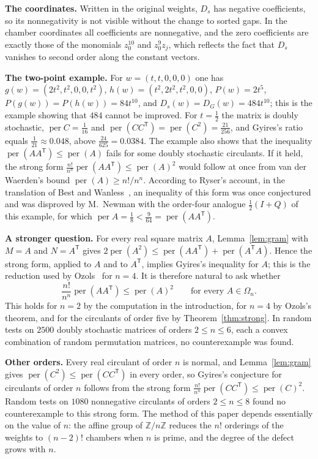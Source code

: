 \documentclass[11pt,a4paper]{article}
\theoremstyle{definition}
\theoremstyle{remark}
\newcommand{\Z}{\mathbb{Z}}
\newcommand{\per}{\operatorname{per}}
\newcommand{\T}{\mathsf{T}}
\newcommand{\para}[1]{\par\medskip\noindent\textbf{#1}\enspace}
\begin{document}
\para{The coordinates.} Written in the original weights, $D_s$ has negative coefficients, so its nonnegativity is not
visible without the change to sorted gaps. In the chamber coordinates all coefficients are nonnegative, and the
zero coefficients are exactly those of the monomials $z_0^{10}$ and $z_0^9z_j$, which reflects the fact that $D_s$
vanishes to second order along the constant vectors.

\para{The two-point example.} For $w=(t,t,0,0,0)$ one has $g(w)=(2t^2,t^2,0,0,t^2)$, $h(w)=(t^2,2t^2,t^2,0,0)$,
$P(w)=2t^5$, $P(g(w))=P(h(w))=84t^{10}$, and $D_s(w)=D_G(w)=484t^{10}$; this is the example showing that $484$
cannot be improved. For $t=\frac12$ the matrix is doubly stochastic, $\per C=\frac1{16}$ and $\per(CC^\T)=\per(C^2)=\frac{21}{256}$,
and Gyires's ratio equals $\frac1{21}\approx0.048$, above $\frac{24}{625}=0.0384$. The example also shows that the
inequality $\per(AA^\T)\le\per(A)$ fails for some doubly stochastic circulants. If it held, the strong form
$\frac{n!}{n^n}\per(AA^\T)\le\per(A)^2$ would follow at once from van der Waerden's bound $\per(A)\ge n!/n^n$.
According to Ryser's account, in the translation of Best and Wanless~\cite{bw}, an inequality of this form was once
conjectured and was disproved by M.~Newman with the order-four analogue $\frac12(I+Q)$ of this example, for which
$\per A=\frac18<\frac9{64}=\per(AA^\T)$.

\para{A stronger question.} For every real square matrix $A$, Lemma~\ref{lem:gram} with $M=A$ and $N=A^\T$ gives
$2\per(A^2)\le\per(AA^\T)+\per(A^\T A)$. Hence the strong form, applied to $A$ and to $A^\T$, implies Gyires's
inequality for $A$; this is the reduction used by Ozols~\cite{ozols} for $n=4$. It is therefore natural to ask whether
\[
\frac{n!}{n^n}\per(AA^\T)\le\per(A)^2\qquad\text{for every }A\in\Omega_n .
\]
This holds for $n=2$ by the computation in the introduction, for $n=4$ by Ozols's theorem, and for the circulants of
order five by Theorem~\ref{thm:strong}. In random tests on $2500$ doubly stochastic matrices of orders $2\le n\le6$,
each a convex combination of random permutation matrices, no counterexample was found.

\para{Other orders.} Every real circulant of order $n$ is normal, and Lemma~\ref{lem:gram} gives
$\per(C^2)\le\per(CC^\T)$ in every order, so Gyires's conjecture for circulants of order $n$ follows from the strong
form $\frac{n!}{n^n}\per(CC^\T)\le\per(C)^2$. Random tests on $1080$ nonnegative circulants of orders $2\le n\le8$
found no counterexample to this strong form. The method of this paper depends essentially on the value of $n$: the
affine group of $\Z/n\Z$ reduces the $n!$ orderings of the weights to $(n-2)!$ chambers when $n$ is prime, and the
degree of the defect grows with $n$.
\end{document}
